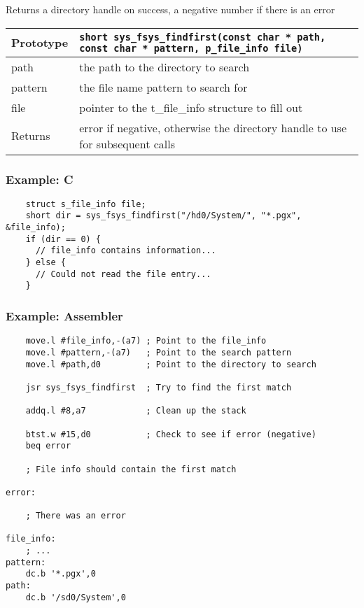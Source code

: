Returns a directory handle on success, a negative number if there is an error

\bigskip

\begin{tabular}{|l||l|} \hline
Prototype & \lstinline!short sys_fsys_findfirst(const char * path, const char * pattern, p_file_info file)! \\ \hline
path & the path to the directory to search \\ \hline
pattern & the file name pattern to search for \\ \hline
file & pointer to the t\_file\_info structure to fill out \\ \hline
Returns & error if negative, otherwise the directory handle to use for subsequent calls \\ \hline
\end{tabular}

\subsubsection*{Example: C}
\begin{lstlisting}
    struct s_file_info file;
    short dir = sys_fsys_findfirst("/hd0/System/", "*.pgx", &file_info);
    if (dir == 0) {
      // file_info contains information...
    } else {
      // Could not read the file entry...
    }
\end{lstlisting}

\subsubsection*{Example: Assembler}
\begin{verbatim}
    move.l #file_info,-(a7) ; Point to the file_info 
    move.l #pattern,-(a7)   ; Point to the search pattern
    move.l #path,d0         ; Point to the directory to search

    jsr sys_fsys_findfirst  ; Try to find the first match

    addq.l #8,a7            ; Clean up the stack

    btst.w #15,d0           ; Check to see if error (negative)
    beq error

    ; File info should contain the first match

error:

    ; There was an error

file_info:
    ; ...
pattern:
    dc.b '*.pgx',0
path:
    dc.b '/sd0/System',0
\end{verbatim}



